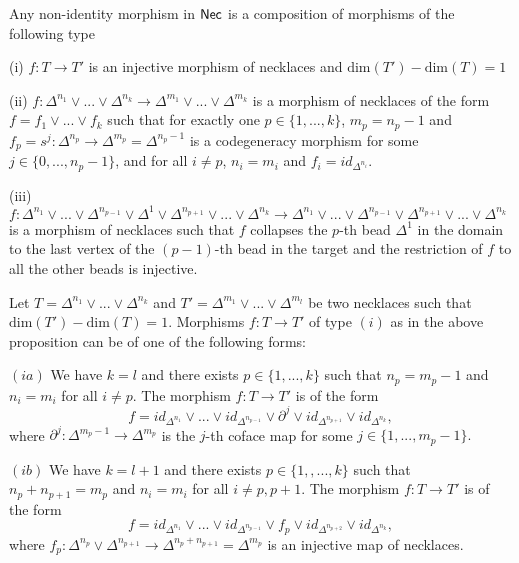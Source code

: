 \begin{proposition}\label{Necmorphs} Any non-identity morphism in $\mathsf{Nec}$ is a composition of morphisms of the following type
\begin{item}
\item (i)  $f: T \to T'$ is an injective morphism of necklaces and $ \text{dim}(T')- \text{dim}(T)=1$
\\
\item (ii) $f: \Delta^{n_1} \vee ... \vee \Delta^{n_k} \to \Delta^{m_1} \vee ... \vee \Delta^{m_k}$ is a morphism of necklaces of the form $f=f_1 \vee ... \vee f_k$ such that for exactly one $p \in \{1,...,k\}$, $m_p=n_p-1$ and $f_p= s^j: \Delta^{n_p} \to \Delta^{m_p}= \Delta^{n_p-1}$ is a codegeneracy morphism for some $j \in \{0,...,n_p-1\}$, and for all $i \neq p$, $n_i=m_i$ and $f_i=id_{\Delta^{n_i}}$. 
\\
\item (iii) $f: \Delta^{n_1} \vee ...\vee \Delta^{n_{p-1}} \vee \Delta^1 \vee \Delta^{n_{p+1}} \vee... \vee  \Delta^{n_k} \to \Delta^{n_1} \vee ...\vee \Delta^{n_{p-1}} \vee \Delta^{n_{p+1}} \vee... \vee  \Delta^{n_k}$ is a morphism of necklaces such that $f$ collapses the $p$-th bead $\Delta^1$  in the domain to the last vertex of the $(p-1)$-th bead in the target and the restriction of $f$ to all the other beads is injective. 
\end{item}
\end{proposition}

\begin{remark}\label{cofaces} Let $T= \Delta^{n_1} \vee ... \vee \Delta^{n_k}$ and $T'= \Delta^{m_1}\vee ... \vee \Delta^{m_l}$ be two necklaces such that $\text{dim}(T')-\text{dim}(T)=1$. Morphisms $f: T \to T'$ of type $(i)$ as in the above proposition can be of one of the following forms:
\begin{item}
\item $(ia)$ We have $k=l$ and there exists $p \in \{1,...,k\}$ such that $n_p= m_p - 1$ and $n_i = m_i$ for all $i \neq p$. The morphism $f: T\to T'$ is of the form $$f=id_{\Delta^{n_1}} \vee ... \vee id_{\Delta^{n_{p-1}}} \vee \partial^j \vee id_{\Delta^{n_{p+1}}} \vee id_{\Delta^{n_k}},$$ where $\partial^j: \Delta^{m_p-1} \to \Delta^{m_p}$ is the $j$-th coface map for some $j \in \{1,...,m_p-1\}.$ 

\item $(ib)$ We have $k=l+1$ and there exists $p \in \{1,,...,k\}$ such that $n_p + n_{p+1} = m_p$ and $n_i=m_i$ for all $i \neq p, p+1$. The morphism $f: T \to T'$ is of the form
$$f=id_{\Delta^{n_1}} \vee ... \vee id_{\Delta^{n_{p-1}}} \vee f_p \vee id_{\Delta^{n_{p+2}}} \vee id_{\Delta^{n_k}},$$
where $f_p: \Delta^{n_p} \vee \Delta^{n_{p+1}} \to \Delta^{n_p + n_{p+1}}=\Delta^{m_p}$ is an injective map of necklaces. 
\end{item}
\end{remark} 

